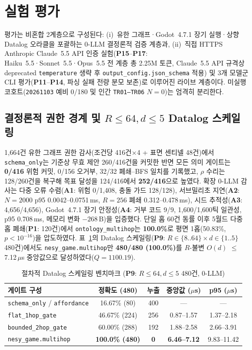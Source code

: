 \section{실험 평가}\label{sec:eval}
평가는 비혼합 2계층으로 구성된다: (i)~유한 그래프·Godot~4.7.1 장기 실행·상향 Datalog 오라클을 포괄하는 0-LLM 결정론적 검증 계층과, (ii)~직접 HTTPS Anthropic Claude~5.5 API 인증 실험(\textbf{P15}--\textbf{P17}: Haiku~5.5·Sonnet~5.5·Opus~5.5 전 계층 총 2.25M 토큰, Claude~5.5 API 규격상 deprecated \texttt{temperature} 생략 후 \texttt{output\_config.json\_schema} 적용) 및 3개 모델군 CLI 평가(\textbf{P11}--\textbf{P14}, 파싱 실패 전량 분모 보존)로 이루어진 라이브 계층이다. 미실행 코호트(\texttt{20261103} 예비 0/180 및 인간 \texttt{TR01--TR06} $N{=}0$)는 엄격히 분리한다.

\subsection{결정론적 권한 경계 및 $R{\le}64, d{\le}5$ Datalog 스케일링}
1,664건 유한 그래프 권한 감사(조건당 416건$\times$4 + 표면 센티넬 48건)에서 \texttt{schema\_only}는 기준상 무효 제안 260/416건을 커밋한 반면 모든 의미 게이트는 \textbf{0/416} 위험 커밋, 0/156 오거부, 32/32 폐쇄--BFS 일치를 기록했고, $\rho$ 수리는 128/260건을 복구해 목표 달성을 124/416에서 \textbf{252/416}으로 높였다. 확장 0-LLM 감사는 다중 오류 수렴(\textbf{A1}: 위험 0/1,408, 충돌 가드 128/128), 서브밀리초 지연(\textbf{A2}: $N{=}2000$ p95 0.0042--0.0751\,ms, $R{=}256$ 폐쇄 0.312--0.478\,ms), 시드 추적성(\textbf{A3}: 4,656/4,656), Godot~4.7.1 장기 안정성(\textbf{A4}: 거부 코드 9/9, 1,600/1,600틱 일관성, p95 0.708\,ms, 메모리 변화 $-268$\,B)을 입증했다. 단일 홉 60건 동률 이후 5월드 다중 홉 폐쇄(\textbf{P1}: 120건)에서 \texttt{ontology\_\allowbreak multihop}는 \textbf{100.0\%}로 평면 1홉(50.83\%, $p{<}10^{-16}$)을 압도하였다. 표~\ref{tab:phase5-aamas-datalog}의 Datalog 스케일링(\textbf{P9}: $R{\in}\{8..64\}\times d{\in}\{1..5\}$ 480건)에서도 \texttt{nesy\_game.multihop}만 \textbf{480/480 (100.0\%)}를 $R$-불변 $O(d)$ $\le$7.12\,$\mu$s 중앙값으로 달성하였다($Q{=}1100.19$).

\begin{table}[!tbp]
\caption{절차적 Datalog 스케일링 벤치마크 (\textbf{P9}: $R{\le}64, d{\le}5$ 480건, 0-LLM)}
\label{tab:phase5-aamas-datalog}
\centering
\scriptsize
\setlength{\tabcolsep}{3pt}
\begin{tabularx}{\columnwidth}{@{}lcccc@{}}
\toprule
\textbf{게이트 구성} & \textbf{정확도 (480)} & \textbf{누출} & \textbf{중앙값 ($\mu$s)} & \textbf{p95 ($\mu$s)} \\
\midrule
\texttt{schema\_only} / \texttt{affordance} & 16.67\% (80) & 400 & --- & --- \\
\texttt{flat\_1hop\_gate} & 46.67\% (224) & 256 & 0.87--1.57 & 1.37--2.18 \\
\texttt{bounded\_2hop\_gate} & 60.00\% (288) & 192 & 1.88--2.58 & 2.66--3.91 \\
\texttt{nesy\_game.multihop} & \textbf{100.0\% (480)} & \textbf{0} & \textbf{6.46--7.12} & 9.83--11.42 \\
\bottomrule
\end{tabularx}
\end{table}

